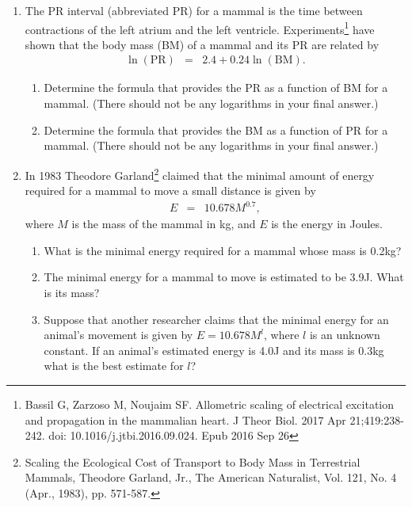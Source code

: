 \begin{enumerate}
\item The PR interval (abbreviated PR) for a mammal is the time
    between contractions of the left atrium and the left ventricle.
    Experiments\footnote{Bassil G, Zarzoso M, Noujaim SF. Allometric
      scaling of electrical excitation and propagation in the
      mammalian heart. J Theor Biol. 2017 Apr 21;419:238-242. doi:
      10.1016/j.jtbi.2016.09.024. Epub 2016 Sep 26} have shown that
    the body mass (BM) of a mammal and its PR are related by
  \begin{eqnarray*}
    \ln\left(\mathrm{PR}\right) & = & 2.4 + 0.24 \ln\left(\mathrm{BM}\right).
  \end{eqnarray*}
  \begin{enumerate}
  \item Determine the formula that provides the PR as a function
    of BM for a mammal. (There should not be any logarithms in your
    final answer.)
  \item Determine the formula that provides the BM as a function
    of PR for a mammal.  (There should not be any logarithms in your
    final answer.)
  \end{enumerate}

\item In 1983 Theodore Garland\footnote{Scaling the Ecological Cost of
    Transport to Body Mass in Terrestrial Mammals, Theodore Garland,
    Jr., The American Naturalist, Vol. 121, No. 4 (Apr., 1983),
    pp. 571-587.} claimed that the minimal amount of energy required
  for a mammal to move a small distance is given by
  \begin{eqnarray*}
    E & = & 10.678 M^{0.7},
  \end{eqnarray*}
  where $M$ is the mass of the mammal in kg, and $E$ is the energy in
  Joules.

  \begin{enumerate}
  \item What is the minimal energy required for a mammal whose mass
    is 0.2kg?
  \item The minimal energy for a mammal to move is estimated to be
    3.9J. What is its mass?
  \item Suppose that another researcher claims that the minimal energy
    for an animal's movement is given by $E = 10.678 M^{l}$, where $l$
    is an unknown constant. If an animal's estimated energy is 4.0J
    and its mass is 0.3kg what is the best estimate for $l$?
  \end{enumerate}

\end{enumerate}
